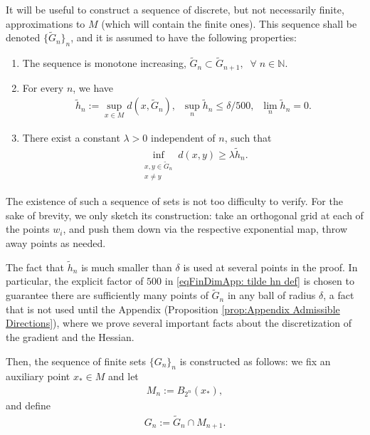 \documentclass[11pt,reqno]{amsart}
\numberwithin{equation}{section}
\theoremstyle{plain}
\begin{document}
  It will be useful to construct a sequence of discrete, but not necessarily finite, approximations to $M$ (which will contain the finite ones). This sequence shall be denoted $\{\tilde G_n\}_n$, and it is assumed to have the following properties:
  \begin{enumerate}
    \item The sequence is monotone increasing, $\tilde G_n \subset \tilde G_{n+1},\;\;\forall\;n\in\mathbb{N}$.	
    \item For every $n$, we have
    \begin{align}\label{eqFinDimApp: tilde hn def}
      \tilde h_n := \sup \limits_{x\in M}d(x,\tilde G_n),\;\;\sup \limits_{n}\tilde h_n\leq \delta/500 ,\;\;\lim\limits_{n} \tilde h_n = 0.
    \end{align}
    \item There exist a constant $\lambda>0$ independent of $n$, such that	
    \begin{align}\label{eqFinDimApp: lambda def}	
      \inf \limits_{\substack{x,y \in \tilde G_n \\  x\neq y}}d(x,y) \geq \lambda \tilde h_n.	
    \end{align}	
	
  \end{enumerate}
  \begin{rem}
    The existence of such a sequence of sets is not too difficulty to verify. For the sake of brevity, we only sketch its construction: take an orthogonal grid at each of the points $w_i$, and push them down via the respective exponential map, throw away points as needed. 
  \end{rem}
  \begin{rem}
    The fact that $\tilde h_n$ is much smaller than $\delta$ is used at several points in the proof. In particular, the explicit factor of $500$ in \eqref{eqFinDimApp: tilde hn def} is chosen to guarantee there are sufficiently many points of $\tilde G_n$ in any ball of radius $\delta$, a fact that is not used until the Appendix (Proposition \ref{prop:Appendix Admissible Directions}), where we prove several important facts about the discretization of the gradient and the Hessian.
  \end{rem}

  Then, the sequence of finite sets $\{G_n\}_n$ is constructed as follows: we fix an auxiliary point $x_* \in M$ and let
  \begin{align}\label{eqFinDimApp: Mn def}
    M_n := B_{2^n}(x_*),
  \end{align}
  and define
  \begin{align}\label{eqFinDimApp: Gn def}
    G_n :=  \tilde G_n \cap M_{n+1}.
  \end{align}
  
\end{document}

